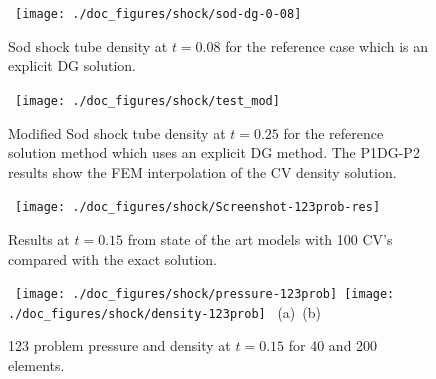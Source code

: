 \begin{figure}[H]
\vbox{
\hbox{
\hspace{-1.cm}
\texttt{[image: ./doc\_figures/shock/sod-dg-0-08]}
}
\vspace{-0.cm}
\vspace{-0.cm}}
\label{sod-40ele-density}
\caption{ Sod shock tube density at $t=0.08$ for the 
reference case which is an explicit DG solution.  }
\end{figure}



\begin{figure}[H]
\vbox{
\hbox{
\hspace{-1.cm}
\texttt{[image: ./doc\_figures/shock/test\_mod]}
}
\vspace{-0.cm}
\vspace{-0.cm}}
\label{sod-dg-density}
\caption{ Modified Sod shock tube density at $t=0.25$ for the 
reference solution method which uses an explicit DG method. The 
P1DG-P2 results show the FEM interpolation of the CV density solution.  }
\end{figure}


\begin{figure}[H]
\vbox{
\hbox{
\hspace{-1.cm}
\texttt{[image: ./doc\_figures/shock/Screenshot-123prob-res]}
}
\vspace{-0.cm}
\vspace{-0.cm}}
\label{Screenshot-123prob-res}
\caption{ Results at $t=0.15$ from state of the art models 
with 100 CV's compared with the exact solution.   }
\end{figure}


\begin{figure}[H]
\vbox{
\hbox{
\hspace{-1.cm}
\texttt{[image: ./doc\_figures/shock/pressure-123prob]}
\hspace{-1.cm}
\texttt{[image: ./doc\_figures/shock/density-123prob]}
}
\vspace{-0.cm}
\hbox{\hspace{4.cm}(a) \hspace{4.5cm}(b)}
\vspace{-0.cm}}
\label{123-prob-pd}
\caption{ 123 problem pressure and density at $t=0.15$ for 
40 and 200 elements. }
\end{figure}


